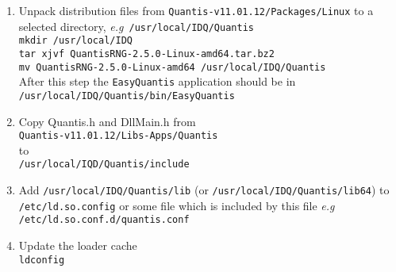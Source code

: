 \documentclass[a4paper,11pt]{article}
\newcommand{\eg}{\textsl{e.g}}
\begin{document}
\begin{enumerate}
    \item Unpack distribution files from
   \texttt{Quantis-v11.01.12/Packages/Linux} to a selected directory, \eg\
   \texttt{/usr/local/IDQ/Quantis}\\ \texttt{mkdir /usr/local/IDQ}\\ \texttt{tar
   xjvf QuantisRNG-2.5.0-Linux-amd64.tar.bz2}\\ \texttt{mv
   QuantisRNG-2.5.0-Linux-amd64 /usr/local/IDQ/Quantis}\\
    After this step the \texttt{EasyQuantis} application should be in\\ \texttt{/usr/local/IDQ/Quantis/bin/EasyQuantis}
    \item Copy {Quantis.h} and {DllMain.h} from\\
   \texttt{Quantis-v11.01.12/Libs-Apps/Quantis}\\ to\\
   \texttt{/usr/local/IQD/Quantis/include}
    \item Add \texttt{/usr/local/IDQ/Quantis/lib} (or
    \texttt{/usr/local/IDQ/Quantis/lib64}) to \\ \texttt{/etc/ld.so.config} or some
    file which is included by this file \eg\ \\
    \texttt{/etc/ld.so.conf.d/quantis.conf}
    \item Update the loader cache\\
    \texttt{ldconfig}
\end{enumerate}
\end{document}
